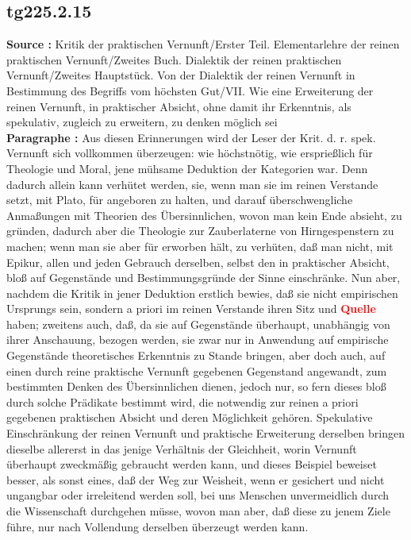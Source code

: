 \documentclass[a4paper,12pt,twoside]{book}
\newcommand{\match}[1]{\textcolor{red}{\textbf{#1}}}
\begin{document}
	\subsection*{tg225.2.15} 
	\textbf{Source : }Kritik der praktischen Vernunft/Erster Teil. Elementarlehre der reinen praktischen Vernunft/Zweites Buch. Dialektik der reinen praktischen Vernunft/Zweites Hauptstück. Von der Dialektik der reinen Vernunft in Bestimmung des Begriffs vom höchsten Gut/VII. Wie eine Erweiterung der reinen Vernunft, in praktischer Absicht, ohne damit ihr Erkenntnis, als spekulativ, zugleich zu erweitern, zu denken möglich sei\\  
	
	\noindent\textbf{Paragraphe : }
	Aus diesen Erinnerungen wird der Leser der Krit. d. r. spek. Vernunft sich vollkommen überzeugen: wie höchstnötig, wie ersprießlich für Theologie und Moral, jene mühsame Deduktion der Kategorien war. Denn dadurch allein kann verhütet werden, sie, wenn man sie im reinen Verstande setzt, mit Plato, für angeboren zu halten, und darauf überschwengliche Anmaßungen mit Theorien des Übersinnlichen, wovon man kein Ende absieht, zu gründen, dadurch aber die Theologie zur Zauberlaterne von Hirngespenstern zu machen; wenn man sie aber für erworben hält, zu verhüten, daß man nicht, mit Epikur, allen und jeden Gebrauch derselben, selbst den in praktischer Absicht, bloß auf Gegenstände und Bestimmungsgründe der Sinne einschränke. Nun aber, nachdem die Kritik in jener Deduktion erstlich bewies, daß sie nicht empirischen Ursprungs sein, sondern a priori im reinen Verstande ihren Sitz und \match{Quelle} haben; zweitens auch, daß, da sie auf Gegenstände überhaupt, unabhängig von ihrer Anschauung, bezogen werden, sie zwar nur in Anwendung auf empirische Gegenstände theoretisches Erkenntnis zu Stande bringen, aber doch auch, auf einen durch reine praktische Vernunft gegebenen Gegenstand angewandt, zum bestimmten Denken des Übersinnlichen dienen, jedoch nur, so fern dieses bloß durch solche Prädikate bestimmt wird, die notwendig zur reinen a priori gegebenen praktischen Absicht und deren Möglichkeit gehören. Spekulative Einschränkung der reinen Vernunft und praktische Erweiterung derselben bringen dieselbe allererst in das jenige Verhältnis der Gleichheit, worin Vernunft überhaupt zweckmäßig gebraucht werden kann, und dieses Beispiel beweiset besser, als sonst eines, daß der Weg zur Weisheit, wenn er gesichert und nicht ungangbar oder irreleitend werden soll, bei uns Menschen unvermeidlich durch die Wissenschaft durchgehen müsse, wovon man aber, daß diese zu jenem Ziele führe, nur nach Vollendung derselben überzeugt werden kann. 
	
\end{document}
